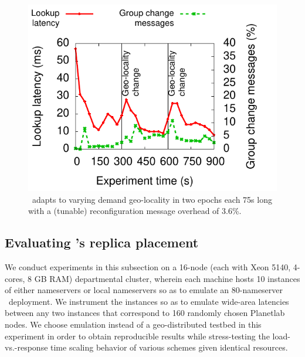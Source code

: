 {\begin{figure}[t]
\begin{minipage}[b]{0.35\linewidth}
\label{fig:ttc}
\end{minipage}
\hspace{0.3cm}
\begin{minipage}[b]{0.3\linewidth}
\centering
\includegraphics[scale=0.55]{graph/camera-ready/latency_by_time.pdf}
\caption{\auspice\ adapts to varying demand geo-locality in two epochs each 75s long with a (tunable) reconfiguration message overhead of 3.6\%.}
\label{fig:latency-time}
\end{minipage}
\end{figure}
}


\vsp
\subsection{Evaluating \auspice's replica placement}
\label{sec:comparison}

We conduct experiments in this subsection on a 16-node (each with Xeon 5140, 4-cores, 8 GB RAM) departmental cluster, wherein each machine hosts 10 instances of either nameservers or local nameservers so as to emulate an 80-nameserver \auspice\ deployment. We instrument the instances so as to emulate wide-area latencies between any two instances that correspond to 160 randomly chosen Planetlab nodes. We choose emulation instead of a geo-distributed testbed in this experiment in order to obtain reproducible results while stress-testing the load-vs.-response time scaling behavior of various schemes given identical resources.

